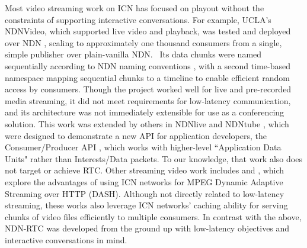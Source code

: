 \documentclass{icn/sig-alternate-2013} %
\newcommand{\ndnrtcName}{NDN-RTC} %
\begin{document}
Most video streaming work on ICN has focused on playout without the constraints of supporting interactive conversations.  For example, UCLA's NDNVideo, which supported live video and playback, was tested and deployed over NDN \cite{ndnvideo}, scaling to approximately one thousand consumers from a single, simple publisher over plain-vanilla NDN.~\cite{CrowleyNEAPresentation} Its data chunks were named sequentially according to NDN naming conventions \cite{ndnnaming}, with a second time-based namespace mapping sequential chunks to a timeline to enable efficient random access by consumers. Though the project worked well for live and pre-recorded media streaming, it did not meet requirements for low-latency communication, and its architecture was not immediately extensible for use as a conferencing solution. This work was extended by others in NDNlive and NDNtube \cite{ndnlive-tube}, which were designed to demonstrate  a new API for application developers, the Consumer/Producer API \cite{cons-prod-api}, which works with higher-level ``Application Data Units" rather than Interests/Data packets.  To our knowledge, that work also does not target or achieve RTC. %
Other streaming video work includes \cite{ccn-dash} and \cite{ndn-dash}, which explore the advantages of using ICN networks for MPEG Dynamic Adaptive Streaming over HTTP (DASH). Although not directly related to low-latency streaming, these works also leverage ICN networks' caching ability for serving chunks of video files efficiently to multiple consumers.
In contrast with the above, \ndnrtcName{} was developed from the ground up with low-latency objectives and interactive conversations in mind. %
\end{document}
